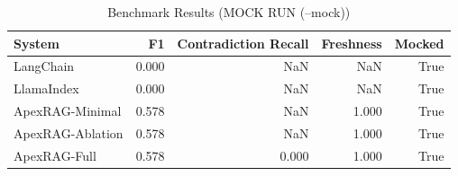 \begin{table}
\caption{Benchmark Results (MOCK RUN (--mock))}
\begin{tabular}{lrrrr}
\toprule
System & F1 & Contradiction Recall & Freshness & Mocked \\
\midrule
LangChain & 0.000 & NaN & NaN & True \\
LlamaIndex & 0.000 & NaN & NaN & True \\
ApexRAG-Minimal & 0.578 & NaN & 1.000 & True \\
ApexRAG-Ablation & 0.578 & NaN & 1.000 & True \\
ApexRAG-Full & 0.578 & 0.000 & 1.000 & True \\
\bottomrule
\end{tabular}
\end{table}
